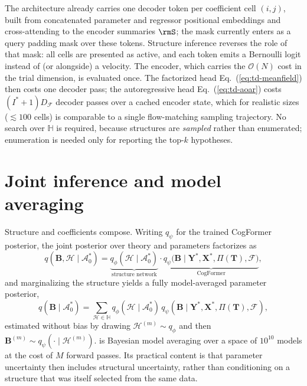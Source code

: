\documentclass[11pt]{article}
\newcommand{\rmB}{\mathbf{B}}
\newcommand{\rmX}{\mathbf{X}}
\newcommand{\rmY}{\mathbf{Y}}
\newcommand{\rmT}{\mathbf{T}}
\providecommand{\cref}[1]{Eq.~(\ref{#1})}
\begin{document}
The architecture already carries one decoder token per coefficient cell $(i,j)$, built
from concatenated parameter and regressor positional embeddings and cross-attending to
the encoder summaries $\rmS$; the mask currently enters as a query padding mask over
these tokens. Structure inference reverses the role of that mask: all cells are
presented as active, and each token emits a Bernoulli logit instead of (or alongside) a
velocity. The encoder, which carries the $\mathcal{O}(N)$ cost in the trial dimension,
is evaluated once. The factorized head \cref{eq:td-meanfield} then costs one decoder
pass; the autoregressive head \cref{eq:td-aoar} costs $(I^\ast+1)D_\mathcal{F}$ decoder
passes over a cached encoder state, which for realistic sizes ($\lesssim 100$ cells) is
comparable to a single flow-matching sampling trajectory. No search over $\mathbb{H}$ is
required, because structures are \emph{sampled} rather than enumerated; enumeration is
needed only for reporting the top-$k$ hypotheses.

\section{Joint inference and model averaging}

Structure and coefficients compose. Writing $q_\psi$ for the trained CogFormer
posterior, the joint posterior over theory and parameters factorizes as
%
\begin{equation}
\label{eq:td-joint}
q(\rmB, \mathcal{H} \mid \mathcal{A}_0^\ast)
= \underbrace{q_\phi(\mathcal{H} \mid \mathcal{A}_0^\ast)}_{\text{structure network}}
\cdot
\underbrace{q_\psi\big(\rmB \mid \rmY^\ast, \rmX^\ast, \Pi(\rmT), \mathcal{F}\big)}_{\text{CogFormer}},
\end{equation}
%
and marginalizing the structure yields a fully model-averaged parameter posterior,
%
\begin{equation}
\label{eq:td-bma}
q(\rmB \mid \mathcal{A}_0^\ast)
= \sum_{\mathcal{H} \in \mathbb{H}} q_\phi(\mathcal{H} \mid \mathcal{A}_0^\ast)\,
q_\psi(\rmB \mid \rmY^\ast, \rmX^\ast, \Pi(\rmT), \mathcal{F}),
\end{equation}
%
estimated without bias by drawing $\mathcal{H}^{(m)} \sim q_\phi$ and then
$\rmB^{(m)} \sim q_\psi(\cdot \mid \mathcal{H}^{(m)})$.  is Bayesian
model averaging over a space of $10^{10}$ models at the cost of $M$ forward passes.
Its practical content is that parameter uncertainty then includes structural
uncertainty, rather than conditioning on a structure that was itself selected from the
same data.
\end{document}

